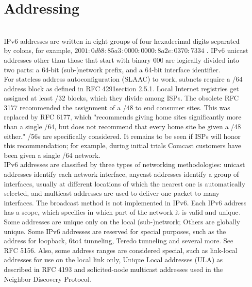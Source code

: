 \documentclass[12pt]{article}
\begin{document}
\section{Addressing}\\
IPv6 addresses are written in eight groups of four hexadecimal digits separated by colons, for example, $2001:0db8:85a3:0000:0000:8a2e:0370:7334$ . IPv6 unicast addresses other than those that start with binary 000 are logically divided into two parts: a 64-bit (sub-)network prefix, and a 64-bit interface identifier.\\
For stateless address autoconfiguration (SLAAC) to work, subnets require a /64 address block as defined in RFC 4291section 2.5.1. Local Internet registries get assigned at least /32 blocks, which they divide among ISPs. The obsolete RFC 3177 recommended the assignment of a /48 to end consumer sites. This was replaced by RFC 6177, which "recommends giving home sites significantly more than a single /64, but does not recommend that every home site be given a /48 either." /56s are specifically considered. It remains to be seen if ISPs will honor this recommendation; for example, during initial trials Comcast customers have been given a single /64 network.\\
IPv6 addresses are classified by three types of networking methodologies: unicast addresses identify each network interface, anycast addresses identify a group of interfaces, usually at different locations of which the nearest one is automatically selected, and multicast addresses are used to deliver one packet to many interfaces. The broadcast method is not implemented in IPv6. Each IPv6 address has a scope, which specifies in which part of the network it is valid and unique. Some addresses are unique only on the local (sub-)network; Others are globally unique.
Some IPv6 addresses are reserved for special purposes, such as the address for loopback, 6to4 tunneling, Teredo tunneling and several more. See RFC 5156. Also, some address ranges are considered special, such as link-local addresses for use on the local link only, Unique Local addresses (ULA) as described in RFC 4193 and solicited-node multicast addresses used in the Neighbor Discovery Protocol.\\
\end{document}
